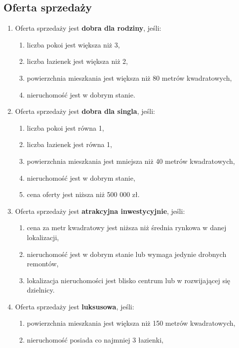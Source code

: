 \subsection{Oferta sprzedaży}
\begin{enumerate}[label=S\arabic*.]
    \item Oferta sprzedaży jest \textbf{dobra dla rodziny}, jeśli:
    \begin{enumerate}[label=\arabic*.]
        \item liczba pokoi jest większa niż 3,
        \item liczba łazienek jest większa niż 2,
        \item powierzchnia mieszkania jest większa niż 80 metrów kwadratowych,
        \item nieruchomość jest w dobrym stanie.
    \end{enumerate}
    \item Oferta sprzedaży jest \textbf{dobra dla singla}, jeśli:
    \begin{enumerate}[label=\arabic*.]
        \item liczba pokoi jest równa 1,
        \item liczba łazienek jest równa 1,
        \item powierzchnia mieszkania jest mniejsza niż 40 metrów kwadratowych,
        \item nieruchomość jest w dobrym stanie,
        \item cena oferty jest niższa niż 500 000 zł.
    \end{enumerate}
    \item Oferta sprzedaży jest \textbf{atrakcyjna inwestycyjnie}, jeśli:
    \begin{enumerate}[label=\arabic*.]
        \item cena za metr kwadratowy jest niższa niż średnia rynkowa w danej lokalizacji,
        \item nieruchomość jest w dobrym stanie lub wymaga jedynie drobnych remontów,
        \item lokalizacja nieruchomości jest blisko centrum lub w rozwijającej się dzielnicy.
    \end{enumerate}
    \item Oferta sprzedaży jest \textbf{luksusowa}, jeśli:
    \begin{enumerate}[label=\arabic*.]
        \item powierzchnia mieszkania jest większa niż 150 metrów kwadratowych,
        \item nieruchomość posiada co najmniej 3 łazienki,

\end{enumerate}
\end{enumerate}
